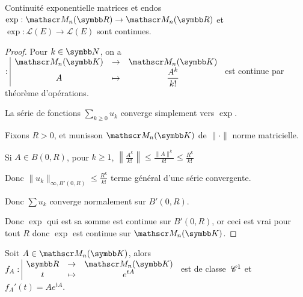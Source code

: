 \begin{proposition}{Continuité exponentielle matrices et endos}{}
    $\exp : \mathscr M_n(\R) \to \mathscr M_n(\R)$ et 
    $\exp : \mathscr L(E) \to \mathscr L(E)$ sont continues. 
\end{proposition}


\begin{proof}
    Pour $k \in \N$, on a 
    $\fonction{}{\mathscr M_n(\K)}{\mathscr M_n(\K)}{A}{\frac{A^k}{k!}}$ est continue par 
    théorème d'opérations. 

    La série de fonctions $\sum_{k \geqslant 0} u_k$ converge simplement 
    vers $\exp$. 

    Fixons $R > 0$, et munisson $\mathscr M_n(\K)$ de $\| \cdot \|$ norme matricielle. 

    Si $A \in B(0, R)$, pour $k \geqslant 1$, $\left\| \frac{A^k}{k!} \right\| \leqslant \frac{\|A\|^k}{k!} \leqslant \frac{R^k}{k!}$

    Donc $\|u_k\|_{\infty, B'(0, R)} \leqslant \frac{R^k}{k!}$ terme général d'une série convergente. 

    Donc $\sum u_k$ converge normalement sur $B'(0, R)$. 

    Donc $\exp$ qui est sa somme est continue sur $B'(0, R)$, or ceci est vrai pour tout $R$
    donc $\exp$ est continue sur $\mathscr M_n(\K)$.
\end{proof}


\begin{proposition}{}{}
    Soit $A \in \mathscr M_n(\K)$, alors $\fonction{f_A}{\R}{\mathscr M_n(\K)}{t}{e^{tA}}$ est de classe $\,\mathscr C^{1}$ 
    et $f_A'(t) = A e^{tA}$.
\end{proposition}

